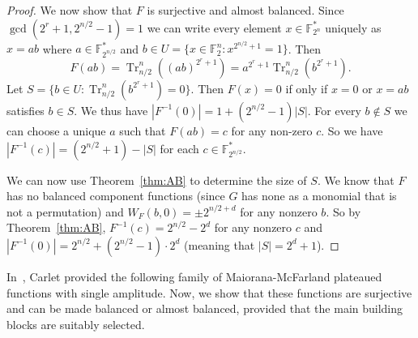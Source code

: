 \documentclass[11pt]{article}
\newcommand{\F}{\mathbb F}
\DeclareMathOperator{\Tr}{Tr}
\theoremstyle{plain}
\theoremstyle{definition}
\numberwithin{theorem}{section}
\numberwithin{equation}{section}
\numberwithin{table}{section}
\numberwithin{figure}{section}
\begin{document}
{\begin{proof}
    We now show that $F$ is surjective and almost balanced. Since $\gcd(2^r+1,2^{n/2}-1)=1$ we can write every element $x\in \F_{2^n}^*$ uniquely as $x=ab$ where $a \in \F_{2^{n/2}}^*$ and $b \in U=\{x \in \F_2^n \colon x^{2^{n/2}+1}=1\}$. Then 
    \[F(ab)=\Tr^n_{n/2}((ab)^{2^r+1})=a^{2^r+1}\Tr^n_{n/2}(b^{2^r+1}).\]
    Let $S = \{b \in U \colon \Tr^n_{n/2}(b^{2^r+1})=0\}$. Then $F(x)=0$ if only if $x=0$ or $x=ab$ satisfies $b \in S$. We thus have $|F^{-1}(0)|=1+(2^{n/2}-1)|S|$. For every $b \notin S$ we can choose a unique $a$ such that $F(ab)=c$ for any non-zero $c$. So we have $|F^{-1}(c)|=(2^{n/2}+1)-|S|$ for each $c \in \F_{2^{n/2}}^*$.

    We can now use Theorem~\ref{thm:AB} to determine the size of $S$. We know that $F$ has no balanced component functions (since $G$ has none as a monomial that is not a permutation) and $W_F(b,0)= \pm 2^{n/2+d}$ for any nonzero $b$. So by Theorem~\ref{thm:AB}, $F^{-1}(c)=2^{n/2}-2^d$ for any nonzero $c$ and $|F^{-1}(0)|=2^{n/2}+(2^{n/2}-1)\cdot 2^d$ (meaning that $|S|=2^d+1$).  
\end{proof}

In~\cite{carlet2015boolean}, Carlet provided the following family of Maiorana-McFarland plateaued functions with single amplitude. Now, we show that these functions are surjective and can be made balanced or almost balanced, provided that the main building blocks are suitably selected.

}
\end{document}

